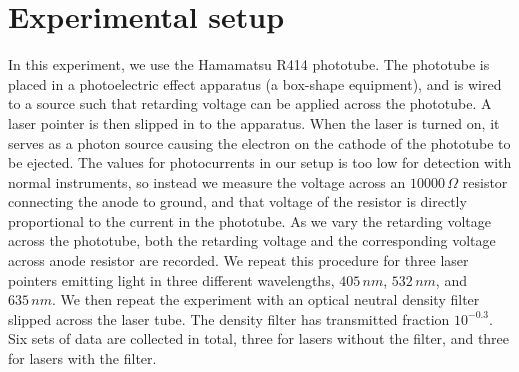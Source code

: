 \documentclass[11pt]{book}
\theoremstyle{break}
\theoremstyle{break}
\begin{document}
\hfill\break
\hfill\break
\section{Experimental setup}
In this experiment, we use the Hamamatsu R414 phototube. The phototube is placed in a photoelectric effect apparatus (a box-shape equipment), and is wired to a source such that retarding voltage can be applied across the phototube. A laser pointer is then slipped in to the apparatus. When the laser is turned on, it serves as a photon source causing the electron on the cathode of the phototube to be ejected. The values for photocurrents in our setup is too low for detection with normal instruments, so instead we measure the voltage across an $10000\,\Omega$ resistor connecting the anode to ground, and that voltage of the resistor is directly proportional to the current in the phototube. As we vary the retarding voltage across the phototube, both the retarding voltage and the corresponding voltage across anode resistor are recorded. We repeat this procedure for three laser pointers emitting light in three different wavelengths, $405\, nm$, $532\, nm$, and $635\, nm$. We then repeat the experiment with an optical neutral density filter slipped across the laser tube. The density filter has transmitted fraction $10^{-0.3}$. Six sets of data are collected in total, three for lasers without the filter, and three for lasers with the filter.
\\
 
\newpage
\end{document}
